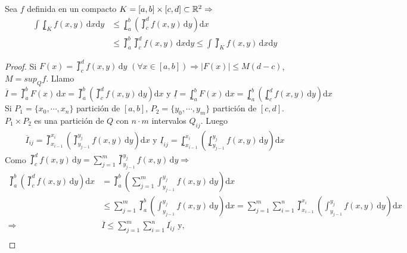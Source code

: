 \clearpage

\begin{theorem}
  Sea $f$ definida en un compacto $K = [a, b] \times [c, d] \subset \mathbb{R}^2 \Rightarrow$
  \begin{align*}
    \int \lowint_K f(x, y) \, \mathrm{d}x \mathrm{d}y & \leq \lowint_a^b(\upint_c^d f(x, y)\, \mathrm{d}y)\mathrm{d}x                                                       \\
                                                      & \leq \upint_a^b \upint_c^d f(x, y) \, \mathrm{d}x \mathrm{d}y \leq \int \upint_K f(x, y) \, \mathrm{d}x \mathrm{d}y
  \end{align*}
  \begin{proof}
    Si $F(x) = \upint_c^d f(x, y) \, \mathrm{d}y$ $(\forall x \in [a, b]) \Rightarrow |F(x)| \leq M (d - c)$, $M = sup_Q f$. Llamo $
      \overline{I} = \upint_a^b F(x)\, \mathrm{d}x = \upint_a^b(\upint_c^d f(x, y)\, \mathrm{d}y) \mathrm{d}x \text{ y }
      \underline{I} = \lowint_a^b F(x)\, \mathrm{d}x = \lowint_a^b( \lowint_c^d f(x, y)\, \mathrm{d}y) \mathrm{d}x
    $ \\
    Si $P_1 = \{x_0, \cdots, x_n\}$ partición de $[a, b]$, $P_2 = \{ y_0, \cdots, y_m \}$ partición de $[c, d]$. $P_1 \times P_2$ es una partición de $Q$ con $n \cdot m$ intervalos $Q_{ij}$. Luego \begin{align*}
      \overline{I}_{ij} = \upint_{x_{i-1}}^{x_i}( \upint_{y_{j-1}}^{y_j}f(x, y)\,\mathrm{d}y)\mathrm{d}x \text{ y }
      \underline{I}_{ij} = \lowint_{x_{i-1}}^{x_i}( \lowint_{y_{j-1}}^{y_j}f(x, y)\,\mathrm{d}y)\mathrm{d}x
    \end{align*} Como $\upint_c^d f(x, y)\, \mathrm{d}y = \sum_{j = 1}^m \upint_{y_{j-1}}^{y_j} f(x, y)\, \mathrm{d}y \Rightarrow$ \begin{align*}
      \upint_a^b(\upint_c^d f(x, y)\, \mathrm{d}y)\mathrm{d}x & = \upint_a^b( \sum_{j = 1}^m \int_{y_{j-1}}^{y_j}f(x, y)\, \mathrm{d}y)\mathrm{d}x                                                                                                              \\
                                                              & \leq \sum_{j = 1}^m \upint_a^b(\int_{y_{j-1}}^{y_j}f(x, y)\, \mathrm{d}y)\mathrm{d}x = \sum_{j = 1}^m \sum_{i = 1}^n \upint_{x_{i-1}}^{x_i}(\int_{y_{j-1}}^{y_j}f(x,y)\,\mathrm{d}y)\mathrm{d}x \\
      \Rightarrow                                             & \overline{I} \leq \sum_{j = 1}^m \sum_{i = 1}^n \overline{I_{ij}} \text{ y,}                                                                                                                    \\

\end{align*}
\end{proof}
\end{theorem}
